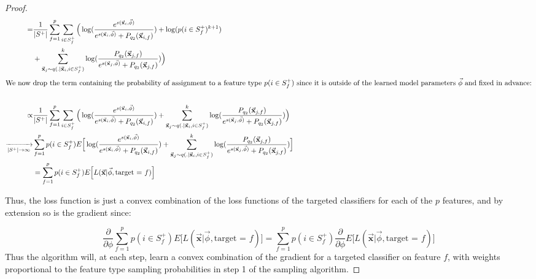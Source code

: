 \documentclass{article} %
\begin{document}
\begin{proof}
\begin{align*}
   = & \frac{1}{|S^+|}\sum_{f=1}^p \sum_{i \in S^+_f} \Big( \log(\frac{e^{s(\vec{\mathbf{x}}_i,\vec{\phi}) }}{e^{s(\vec{\mathbf{x}}_i,\vec{\phi}) } + P_{q_2}(\vec{\mathbf{x}}_{i,f}) }) + \log(p(i \in S^+_f)^{k+1})\\
  &   +  \sum_{\vec{\mathbf{x}}_{j} \sim q(.|\vec{\mathbf{x}}_i,i\in S^+_f)}^k \log(\frac{ P_{q_2}(\vec{\mathbf{x}}_{j,f})}{e^{s(\vec{\mathbf{x}}_{j},\vec{\phi}) } + P_{q_2}(\vec{\mathbf{x}}_{j,f})})   \Big) \\
\intertext{We now drop the term containing the probability of assignment to a feature type $p(i \in S^+_f)$ since it is outside of the learned model parameters $\vec{\phi}$ and fixed in advance:}\\
    \propto & \frac{1}{|S^+|} \sum_{f=1}^p \sum_{i \in S^+_f} \Big( \log(\frac{e^{s(\vec{\mathbf{x}}_i,\vec{\phi}) }}{e^{s(\vec{\mathbf{x}}_i,\vec{\phi}) } + P_{q_2}(\vec{\mathbf{x}}_{i,f}) }) + \sum_{\vec{\mathbf{x}}_{j} \sim q(.|\vec{\mathbf{x}}_i,i\in S^+_f)}^k \log(\frac{ P_{q_2}(\vec{\mathbf{x}}_{j,f})}{e^{s(\vec{\mathbf{x}}_{j},\vec{\phi}) } + P_{q_2}(\vec{\mathbf{x}}_{j,f})}) \Big) \\
    \xrightarrow[|S^+|\rightarrow \infty]{ }  & \sum_{f=1}^p p(i \in S^+_f) E\Big[ \log(\frac{e^{s(\vec{\mathbf{x}}_i,\vec{\phi}) }}{e^{s(\vec{\mathbf{x}}_i,\vec{\phi}) } + P_{q_2}(\vec{\mathbf{x}}_{i,f}) }) + \sum_{\vec{\mathbf{x}}_{j} \sim q(.|\vec{\mathbf{x}}_i,i\in S^+_f)}^k \log(\frac{ P_{q_2}(\vec{\mathbf{x}}_{j,f})}{e^{s(\vec{\mathbf{x}}_{j},\vec{\phi}) } + P_{q_2}(\vec{\mathbf{x}}_{j,f})}) \Big] \\
   & = \sum_{f=1}^p p(i \in S^+_f) E\Big[ L(\vec{\mathbf{x}} |\vec{\phi}, \text{target = $f$}) \Big]
\end{align*}

Thus, the loss function is just a convex combination  of the loss functions of the targeted classifiers for each of the $p$ features, and by extension so is the gradient since:

\[\frac{\partial }{\partial \phi}\sum_{f=1}^p p(i \in S^+_f) E\Big[ L(\vec{\mathbf{x}} |\vec{\phi}, \text{target = $f$}) \Big] =
 \sum_{f=1}^p p(i \in S^+_f) \frac{\partial }{\partial \phi}E\Big[ L(\vec{\mathbf{x}} |\vec{\phi}, \text{target = $f$}) \Big]\]
 Thus the algorithm will, at each step, learn a convex combination of the gradient for a targeted classifier on feature $f$, with weights proportional to the feature type sampling probabilities in step 1 of the sampling algorithm.
\end{proof}
\end{document}
